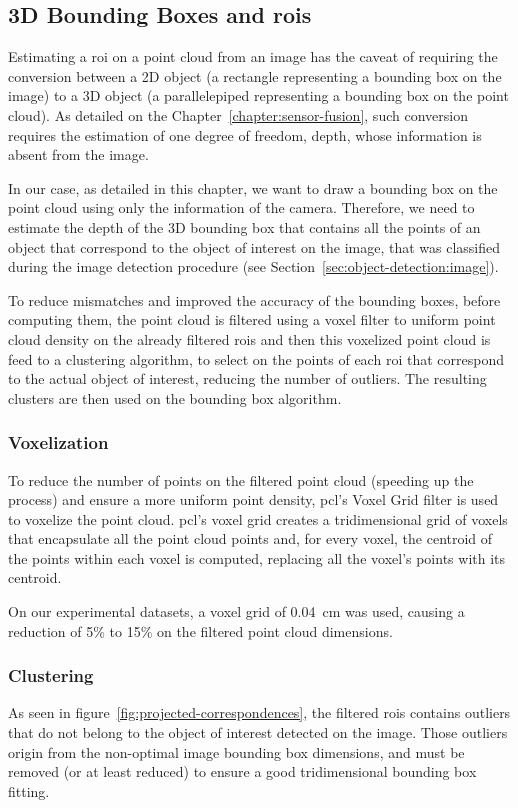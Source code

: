 \subsection{3D Bounding Boxes and \aclp{roi}}
\label{subsec:object-detection:bounding-boxes-and-roi}
Estimating a \ac{roi} on a point cloud from an image has the caveat of requiring the conversion between a 2D object (a rectangle representing a bounding box on the image) to a 3D object (a parallelepiped representing a bounding box on the point cloud). As detailed on the Chapter~\ref{chapter:sensor-fusion}, such conversion requires the estimation of one degree of freedom, depth, whose information is absent from the image.

In our case, as detailed in this chapter, we want to draw a bounding box on the point cloud using only the information of the camera. Therefore, we need to estimate the depth of the 3D bounding box that contains all the points of an object that correspond to the object of interest on the image, that was classified during the image detection procedure (see Section~\ref{sec:object-detection:image}).

To reduce mismatches and improved the accuracy of the bounding boxes, before computing them, the point cloud is filtered using a voxel filter to uniform point cloud density on the already filtered \acp{roi} and then this voxelized point cloud is feed to a clustering algorithm, to select on the points of each \ac{roi} that correspond to the actual object of interest, reducing the number of outliers. The resulting clusters are then used on the bounding box algorithm.


\subsubsection{Voxelization}
To reduce the number of points on the filtered point cloud (speeding up the process) and ensure a more uniform point density, \ac{pcl}'s Voxel Grid filter is used to voxelize the point cloud. \ac{pcl}'s voxel grid creates a tridimensional grid of voxels that encapsulate all the point cloud points and, for every voxel, the centroid of the points within each voxel is computed, replacing all the voxel's points with its centroid.

On our experimental datasets, a voxel grid of \SI{0.04}{\centi\meter} was used, causing a reduction of 5\% to 15\% on the filtered point cloud dimensions.

\subsubsection{Clustering}
As seen in figure~\ref{fig:projected-correspondences}, the filtered \acp{roi} contains outliers that do not belong to the object of interest detected on the image. Those outliers origin from the non-optimal image bounding box dimensions, and must be removed (or at least reduced) to ensure a good tridimensional bounding box fitting.

